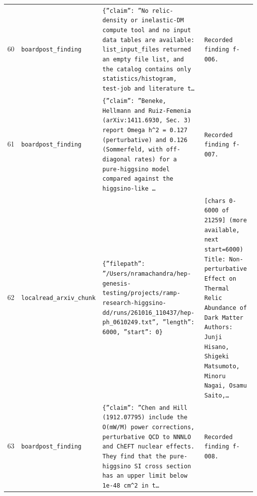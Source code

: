 \documentclass[11pt,a4paper]{article}
\begin{document}
\begin{longtable}{@{}p{}p{}p{}p{}@{}}
60 & \texttt{board}\newline\texttt{post\_\allowbreak{}finding} & \texttt{\{''claim'':\allowbreak{} ''No relic-density or inelastic-DM compute tool and no input data tables are available:\allowbreak{} list\_\allowbreak{}input\_\allowbreak{}files returned an empty file list,\allowbreak{} and the catalog contains only statistics/\allowbreak{}histogram,\allowbreak{} test-job and literature t\ldots{}\allowbreak{}} & \texttt{Recorded finding f-006.} \\
61 & \texttt{board}\newline\texttt{post\_\allowbreak{}finding} & \texttt{\{''claim'':\allowbreak{} ''Beneke,\allowbreak{} Hellmann and Ruiz-Femenia (arXiv:\allowbreak{}1411.6930,\allowbreak{} Sec. 3)\allowbreak{} report Omega h\textasciicircum{}\allowbreak{}2 =\allowbreak{} 0.127 (perturbative)\allowbreak{} and 0.126 (Sommerfeld,\allowbreak{} with off-diagonal rates)\allowbreak{} for a pure-higgsino model compared against the higgsino-like \ldots{}\allowbreak{}} & \texttt{Recorded finding f-007.} \\
62 & \texttt{local}\newline\texttt{read\_\allowbreak{}arxiv\_\allowbreak{}chunk} & \texttt{\{''filepath'':\allowbreak{} ''/\allowbreak{}Users/\allowbreak{}nramachandra/\allowbreak{}hep-genesis-testing/\allowbreak{}projects/\allowbreak{}ramp-research-higgsino-dd/\allowbreak{}runs/\allowbreak{}261016\_\allowbreak{}110437/\allowbreak{}hep-ph\_\allowbreak{}0610249.txt'',\allowbreak{} ''length'':\allowbreak{} 6000,\allowbreak{} ''start'':\allowbreak{} 0\}\allowbreak{}} & \texttt{[chars 0-6000 of 21259]\allowbreak{} (more available,\allowbreak{} next start=\allowbreak{}6000)\allowbreak{}  Title:\allowbreak{} Non-perturbative Effect on Thermal Relic Abundance of Dark Matter Authors:\allowbreak{} Junji Hisano,\allowbreak{} Shigeki Matsumoto,\allowbreak{} Minoru Nagai,\allowbreak{} Osamu Saito,\allowbreak{}\ldots{}\allowbreak{}} \\
63 & \texttt{board}\newline\texttt{post\_\allowbreak{}finding} & \texttt{\{''claim'':\allowbreak{} ''Chen and Hill (1912.07795)\allowbreak{} include the O(mW/\allowbreak{}M)\allowbreak{} power corrections,\allowbreak{} perturbative QCD to NNNLO and ChEFT nuclear effects. They find that the pure-higgsino SI cross section has an upper limit below 1e-48 cm\textasciicircum{}\allowbreak{}2 in t\ldots{}\allowbreak{}} & \texttt{Recorded finding f-008.} \\

\end{longtable}
\end{document}
